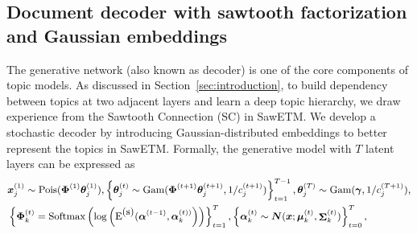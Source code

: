 \documentclass{article}
\newcommand{\xv}[0]{\ensuremath{\boldsymbol{x}} }
\newcommand{\Sigmamat}[0]{\ensuremath{\boldsymbol{\Sigma}} }
\begin{document}


 




\subsection{Document decoder with sawtooth factorization and Gaussian embeddings}
\label{subsec2_2}
The generative network (also known as decoder) is one of the core components of topic models. As discussed in Section~\ref{sec:introduction}, to build dependency between topics at two adjacent layers and learn a deep topic hierarchy, we draw experience from the Sawtooth Connection (SC) in SawETM. We 
develop a stochastic decoder by introducing Gaussian-distributed embeddings to better represent the topics in %
SawETM. Formally, the generative model with $T$ latent layers can be expressed as
\begin{equation} \label{Gaussian-SawETM} \small
\begin{split}
& \bm{x}_j^{(1)} \sim \mbox{Pois}({\bm{\Phi} ^{(1)}}\bm{\theta} _j^{(1)}),
\left\{ {\bm{\theta} _j^{(t)}\sim \mbox{Gam}({\bm{\Phi} ^{(t + 1)}}\bm{\theta} _j^{(t + 1)},1/c_j^{(t + 1)})} \right\}_{t = 1}^{T - 1},
\bm{\theta} _j^{(T)} \sim \mbox{Gam}(\bm{\gamma} ,1/c_j^{(T + 1)}) ,  \\
& \left\{ \bm{\Phi} _k^{( t )} = \mbox{Softmax} \left( \log \left( \mbox{E} ^{\mbox{(s)}} ( \bm{\alpha} ^{({t - 1})},\bm{\alpha} _k^{( t ) )} \right) \right) \right\}_{t = 1}^T , \left\{ {\bm{\alpha} _k^{(t)} \sim \bm{N} ( {\xv;\bm{\mu} _k^{ (t)}, \mathop{\Sigmamat} \nolimits_k^{(t)}} )} \right\}_{t = 0}^T ,
\end{split}
\end{equation}
\end{document}
